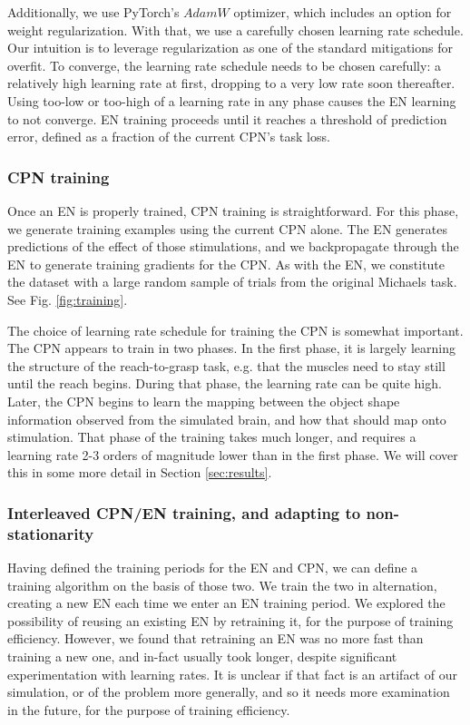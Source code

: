 \documentclass[12pt]{iopart}
\begin{document}
Additionally, we use PyTorch's $AdamW$ optimizer, which includes an option for weight regularization.
With that, we use a carefully chosen learning rate schedule. Our intuition is to leverage regularization as
one of the standard mitigations for overfit. To converge, the learning rate schedule needs
to be chosen carefully: a relatively high learning rate at first, dropping to a very low rate soon
thereafter. Using too-low or too-high of a learning rate in any phase causes the EN learning
to not converge. EN training proceeds until it reaches a threshold of prediction error, defined as
a fraction of the current CPN's task loss.

\subsubsection{CPN training}
Once an EN is properly trained, CPN training is straightforward. For this phase,
we generate training examples using the current CPN alone. The EN generates predictions of the
effect of those stimulations, and we backpropagate through the EN to generate training gradients
for the CPN. As with the EN, we constitute the dataset with a large random sample of trials from
the original Michaels task. See Fig. \ref{fig:training}.

The choice of learning rate schedule for training the CPN is somewhat important.
The CPN appears to train in two phases. In the first phase, it is largely learning the structure
of the reach-to-grasp task, e.g. that the muscles need to stay still until the reach begins. During
that phase, the learning rate can be quite high. Later, the CPN begins to learn the mapping between
the object shape information observed from the simulated brain, and how that should map onto
stimulation. That phase of the training takes much longer, and requires a learning rate 2-3
orders of magnitude lower than in the first phase. We will cover this in some more detail in
Section \ref{sec:results}.

\subsubsection{Interleaved CPN/EN training, and adapting to non-stationarity}
Having defined the training periods for the EN and CPN, we can define a training
algorithm on the basis of those two. We train the two in alternation, creating
a new EN each time we enter an EN training period. We explored the possibility
of reusing an existing EN by retraining it, for the purpose of training efficiency.
However, we found that retraining an EN was no more fast than training a new one,
and in-fact usually took longer, despite significant experimentation with learning
rates. It is unclear if that fact is an artifact of our simulation, or of the
problem more generally, and so it needs more examination in the future, for the
purpose of training efficiency.
\end{document}
